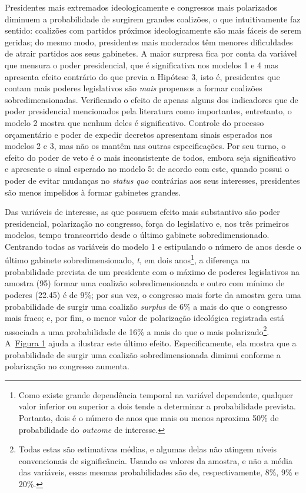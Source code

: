Presidentes mais extremados ideologicamente e congressos mais polarizados diminuem a probabilidade de surgirem grandes coalizões, o que intuitivamente faz sentido: coalizões com partidos próximos ideologicamente são mais fáceis de serem geridas; do mesmo modo, presidentes mais moderados têm menores dificuldades de atrair partidos aos seus gabinetes. A maior surpresa fica por conta da variável que mensura o poder presidencial, que é significativa nos modelos 1 e 4 mas apresenta efeito contrário do que previa a Hipótese 3, isto é, presidentes que contam mais poderes legislativos são \textit{mais} propensos a formar coalizões sobredimensionadas. Verificando o efeito de apenas alguns dos indicadores que de poder presidencial mencionados pela literatura como importantes, entretanto, o modelo 2 mostra que nenhum deles é significativo. Controle do processo orçamentário e poder de expedir decretos apresentam sinais esperados nos modelos 2 e 3, mas não os mantêm nas outras especificações. Por seu turno, o efeito do poder de veto é o mais inconsistente de todos, embora seja significativo e apresente o sinal esperado no modelo 5: de acordo com este, quando possui o poder de evitar mudanças no \textit{status quo} contrárias aos seus interesses, presidentes são menos impelidos à formar gabinetes grandes.

Das variáveis de interesse, as que possuem efeito mais substantivo são poder presidencial, polarização no congresso, força do legislativo e, nos três primeiros modelos, tempo transcorrido desde o último gabinete sobredimensionado. Centrando todas as variáveis do modelo 1 e estipulando o número de anos desde o último gabinete sobredimensionado, \textit{t}, em dois anos\footnote{Como existe grande dependência temporal na variável dependente, qualquer valor inferior ou superior a dois tende a determinar a probabilidade prevista. Portanto, dois é o número de anos que mais ou menos aproxima 50\% de probabilidade do \textit{outcome} de interesse.}, a diferença na probabilidade prevista de um presidente com o máximo de poderes legislativos na amostra (95) formar uma coalizão sobredimensionada e outro com mínimo de poderes (22.45) é de 9\%; por sua vez, o congresso mais forte da amostra gera uma probabilidade de surgir uma coalizão \textit{surplus} de 6\% a mais do que o congresso mais fraco; e, por fim, o menor valor de polarização ideológica registrada está associada a uma probabilidade de 16\% a mais do que o mais polarizado\footnote{Todas estas são estimativas médias, e algumas delas não atingem níveis convencionais de significância. Usando os valores da amostra, e não a média das variáveis, essas mesmas probabilidades são de, respectivamente, 8\%, 9\% e 20\%.}. A~\hyperref[fig:figura1]{Figura 1} ajuda a ilustrar este último efeito. Especificamente, ela mostra que a probabilidade de surgir uma coalizão sobredimensionada diminui conforme a polarização no congresso aumenta.

